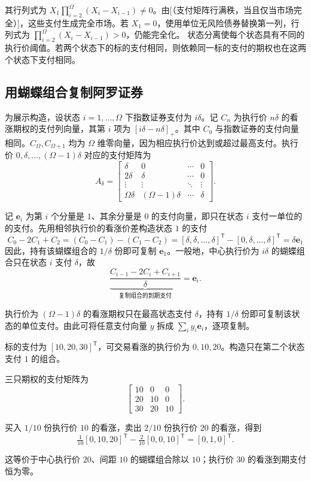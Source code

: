 其行列式为 $X_1\prod_{i=2}^{\Omega}(X_i-X_{i-1})\ne0$。由[（支付矩阵行满秩，当且仅当市场完全）]，这些支付生成完全市场。若 $X_1=0$，使用单位无风险债券替换第一列，行列式为 $\prod_{i=2}^{\Omega}(X_i-X_{i-1})>0$，仍能完全化。
状态分离使每个状态具有不同的执行价阈值。若两个状态下的标的支付相同，则依赖同一标的支付的期权也在这两个状态下支付相同。

\subsection{用蝴蝶组合复制阿罗证券}
为展示构造，设状态 $i=1,\ldots,\Omega$ 下指数证券支付为 $i\delta$。记 $C_n$ 为执行价 $n\delta$ 的看涨期权的支付列向量，其第 $i$ 项为 $[i\delta-n\delta]_+$。其中 $C_0$ 与指数证券的支付向量相同。$C_\Omega,C_{\Omega+1}$ 均为 $\Omega$ 维零向量，因为相应执行价达到或超过最高支付。执行价 $0,\delta,\ldots,(\Omega-1)\delta$ 对应的支付矩阵为
\[
 A_\delta=\begin{bmatrix}
 \delta&0&\cdots&0\\
 2\delta&\delta&\cdots&0\\
 \vdots&\vdots&\ddots&\vdots\\
 \Omega\delta&(\Omega-1)\delta&\cdots&\delta
 \end{bmatrix}.
\]

记 $\mathbf e_i$ 为第 $i$ 个分量是 $1$、其余分量是 $0$ 的支付向量，即只在状态 $i$ 支付一单位的的支付。先用相邻执行价的看涨价差构造状态 $1$ 的支付
\[
 C_0-2C_1+C_2=(C_0-C_1)-(C_1-C_2)
 =[\delta,\delta,\ldots,\delta]^{\mathsf T}
  -[0,\delta,\ldots,\delta]^{\mathsf T}
 =\delta\mathbf e_1
\]
因此，持有该蝴蝶组合的 $1/\delta$ 份即可复制 $\mathbf e_1$。一般地，中心执行价为 $i\delta$ 的蝴蝶组合只在状态 $i$ 支付 $\delta$，故
\[
 \underbrace{\frac{C_{i-1}-2C_i+C_{i+1}}\delta}_{\text{复制组合的到期支付}}
 =\mathbf e_i.
\]

执行价为 $(\Omega-1)\delta$ 的看涨期权只在最高状态支付 $\delta$，持有 $1/\delta$ 份即可复制该状态的单位支付。由此可将任意支付向量 $y$ 拆成 $\sum_i y_i\mathbf e_i$，逐项复制。

\begin{tcolorbox}[example,title=课堂例题：在三个状态中复制第二个状态]
\begin{question}
标的支付为 $[10,20,30]^{\mathsf T}$，可交易看涨的执行价为 $0,10,20$。构造只在第二个状态支付 $1$ 的组合。
\end{question}
\begin{solution}
三只期权的支付矩阵为
\[
 \begin{bmatrix}10&0&0\\20&10&0\\30&20&10\end{bmatrix}.
\]

买入 $1/10$ 份执行价 $10$ 的看涨，卖出 $2/10$ 份执行价 $20$ 的看涨，得到
\[
 \tfrac1{10}[0,10,20]^{\mathsf T}
 -\tfrac2{10}[0,0,10]^{\mathsf T}=[0,1,0]^{\mathsf T}.
\]

这等价于中心执行价 $20$、间距 $10$ 的蝴蝶组合除以 $10$；执行价 $30$ 的看涨到期支付恒为零。
\end{solution}
\end{tcolorbox}

